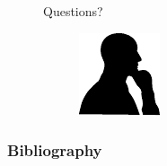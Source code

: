 \documentclass[10pt, british, luatex]{beamer}
\begin{document}
\begin{frame}
	\frametitle{\  }
	\begin{figure}
		\Huge\centering Questions?
		\vspace{1ex}
		\begin{figure}
			\includegraphics[width=.3\textwidth]{images/hombre-pensamiento-silueta.pdf}
		\end{figure}
	\end{figure}
\end{frame}

\appendix%
\begin{frame}[allowframebreaks]
	\frametitle{Bibliography}
	\printbibliography{}%
\end{frame}
\end{document}
